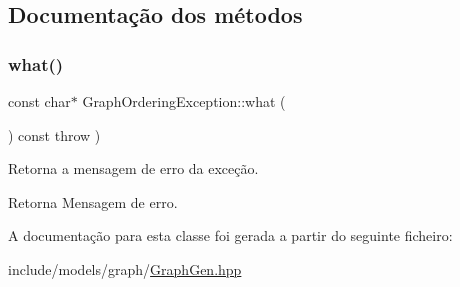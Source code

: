 \subsection{Documentação dos métodos}
\mbox{\label{classGraphOrderingException_a38d6f4e461cd40c0d2e8c07e7a5d6bef}} 
\subsubsection{\texorpdfstring{what()}{what()}}
{\footnotesize\ttfamily const char$\ast$ Graph\+Ordering\+Exception\+::what (\begin{DoxyParamCaption}{ }\end{DoxyParamCaption}) const throw  ) \hspace{0.3cm}{\ttfamily [inline]}}

Retorna a mensagem de erro da exceção. \begin{DoxyReturn}{Retorna}
Mensagem de erro. 
\end{DoxyReturn}


A documentação para esta classe foi gerada a partir do seguinte ficheiro\+:\begin{DoxyCompactItemize}
\item 
include/models/graph/\hyperlink{GraphGen_8hpp}{Graph\+Gen.\+hpp}\end{DoxyCompactItemize}
